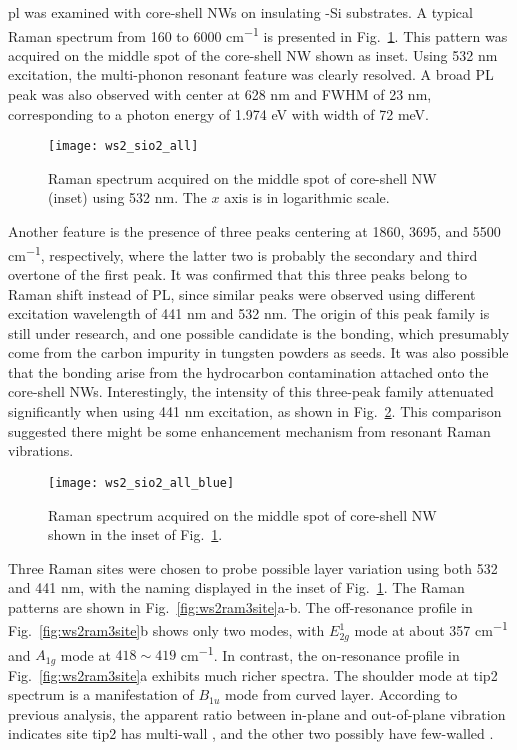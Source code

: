 \Gls{pl} was examined with core-shell NWs on insulating -Si substrates. A typical Raman spectrum from 160 to 6000 \si{cm^{-1}} is presented in Fig.~\ref{fig:ws2ramall}. This pattern was acquired on the middle spot of the core-shell NW shown as inset. Using 532 nm excitation, the multi-phonon resonant feature was clearly resolved. A broad PL peak was also observed with center at 628 nm and FWHM of 23 nm, corresponding to a photon energy of 1.974 eV with width of 72 meV.  
\begin{figure}[htb]
\centering
\texttt{[image: ws2\_sio2\_all]}
\caption[Raman spectrum acquired on the middle spot of core-shell NW (inset) using 532 nm. The $x$ axis is in logarithmic scale]{Raman spectrum acquired on the middle spot of core-shell NW (inset) using 532 nm. The $x$ axis is in logarithmic scale.}
\label{fig:ws2ramall}
\end{figure}
Another feature is the presence of three peaks centering at 1860, 3695, and 5500 \si{cm^{-1}}, respectively, where the latter two is probably the secondary and third overtone of the first peak. It was confirmed that this three peaks belong to Raman shift instead of PL, since similar peaks were observed using different excitation wavelength of 441 nm and 532 nm. The origin of this peak family is still under research, and one possible candidate is the  bonding, which presumably come from the carbon impurity in tungsten powders as seeds. It was also possible that the  bonding arise from the hydrocarbon contamination attached onto the core-shell NWs. Interestingly, the intensity of this three-peak family attenuated significantly when using 441 nm excitation, as shown in Fig.~\ref{fig:ws2ramblue}. This comparison suggested there might be some enhancement mechanism from  resonant Raman vibrations. 
\begin{figure}[htb]
\centering
\texttt{[image: ws2\_sio2\_all\_blue]}
\caption[Raman spectrum acquired on the middle spot of core-shell NW shown in the inset of Fig.~\ref{fig:ws2ramall}]{Raman spectrum acquired on the middle spot of core-shell NW shown in the inset of Fig.~\ref{fig:ws2ramall}.}
\label{fig:ws2ramblue}
\end{figure}
Three Raman sites were chosen to probe possible layer variation using both 532 and 441 nm, with the naming displayed in the inset of Fig.~\ref{fig:ws2ramall}. The Raman patterns are shown in Fig.~\ref{fig:ws2ram3site}a-b. The off-resonance profile in Fig.~\ref{fig:ws2ram3site}b shows only two modes, with $E_{2g}^1$ mode at about 357 \si{cm^{-1}} and $A_{1g}$ mode at $418\sim419$ \si{cm^{-1}}. In contrast, the on-resonance profile in Fig.~\ref{fig:ws2ram3site}a exhibits much richer spectra. The shoulder mode at tip2 spectrum is a manifestation of $B_{1u}$ mode from curved  layer. According to previous analysis, the apparent ratio between in-plane and out-of-plane vibration indicates site tip2 has multi-wall , and the other two possibly have few-walled . 
